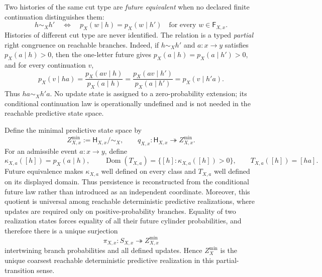 \documentclass[11pt]{article}
\theoremstyle{definition}
\theoremstyle{remark}
\theoremstyle{definition}
\theoremstyle{remark}
\begin{document}
Two histories of the same cut type are \emph{future equivalent} when no declared
finite continuation distinguishes them:
\begin{equation}
 h\sim_X h'
 \quad\Longleftrightarrow\quad
 p_X(w\mid h)=p_X(w\mid h')
 \quad\text{for every }w\in\mathsf F_{X,x}.
\label{eq:ncg-future-equivalence}
\end{equation}
Histories of different cut type are never identified.  The relation is a typed
\emph{partial} right congruence on reachable branches.  Indeed, if $h\sim_Xh'$
and $a:x\to y$ satisfies $p_X(a\mid h)>0$, then the one-letter future gives
$p_X(a\mid h)=p_X(a\mid h')>0$, and for every continuation $v$,
\[
 p_X(v\mid ha)
 =\frac{p_X(av\mid h)}{p_X(a\mid h)}
 =\frac{p_X(av\mid h')}{p_X(a\mid h')}
 =p_X(v\mid h'a).
\]
Thus $ha\sim_Xh'a$.  No update state is assigned to a zero-probability extension;
its conditional continuation law is operationally undefined and is not needed in
the reachable predictive state space.

Define the minimal predictive state space by
\begin{equation}
 Z_{X,x}^{\min}:=\mathsf H_{X,x}/\!\sim_X,
 \qquad
 q_{X,x}:\mathsf H_{X,x}\twoheadrightarrow Z_{X,x}^{\min}.
\label{eq:ncg-predictive-state}
\end{equation}
For an admissible event $a:x\to y$, define
\begin{equation}
 \kappa_{X,a}([h])=p_X(a\mid h),
 \qquad
 \operatorname{Dom}(T_{X,a})
 =\{[h]:\kappa_{X,a}([h])>0\},
 \qquad
 T_{X,a}([h])=[ha].
\label{eq:ncg-predictive-update}
\end{equation}
Future equivalence makes $\kappa_{X,a}$ well defined on every class and
$T_{X,a}$ well defined on its displayed domain.  Thus persistence is reconstructed
from the conditional future law rather than introduced as an independent
coordinate.  Moreover, this quotient is universal among reachable deterministic
predictive realizations, where updates are required only on positive-probability
branches.  Equality of two realization states forces equality of all their future
cylinder probabilities, and therefore there is a unique surjection
\begin{equation}
 \pi_{X,x}:S_{X,x}\twoheadrightarrow Z_{X,x}^{\min}
\label{eq:ncg-predictive-universal}
\end{equation}
intertwining branch probabilities and all defined updates.  Hence $Z_X^{\min}$ is
the unique coarsest reachable deterministic predictive realization in this
partial-transition sense.
\end{document}
